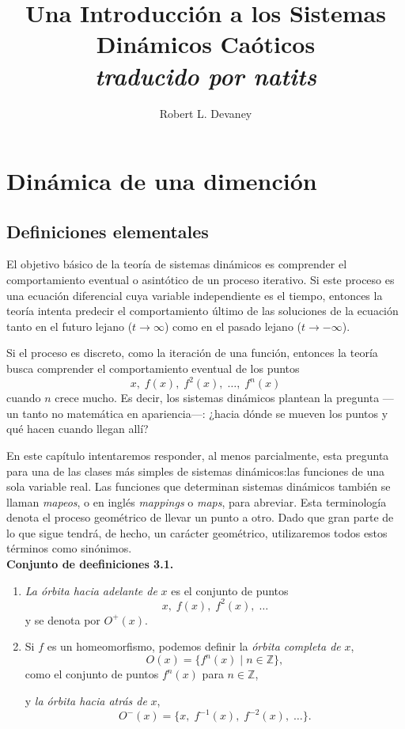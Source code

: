 \documentclass[10pt,a4paper]{book}
\title{Una Introducción a los Sistemas Dinámicos Caóticos \\ \small \textit{traducido por natits}}
\author{Robert L. Devaney}
\begin{document}
\maketitle
\newpage
\tableofcontents
\newpage
\chapter{Dinámica de una dimención}
\section{Definiciones elementales}
El objetivo básico de la teoría de sistemas dinámicos es comprender el comportamiento eventual o asintótico de un proceso iterativo. Si este proceso es una ecuación diferencial cuya variable independiente es el tiempo, entonces la teoría intenta predecir el comportamiento último de las soluciones de la ecuación tanto en el futuro lejano ($t \to \infty$) como en el pasado lejano ($t \to -\infty$).  

Si el proceso es discreto, como la iteración de una función, entonces la teoría busca comprender el comportamiento eventual de los puntos 
\[
x,\; f(x),\; f^{2}(x),\; \dots,\; f^{n}(x)
\]
cuando $n$ crece mucho. Es decir, los sistemas dinámicos plantean la pregunta —un tanto no matemática en apariencia—: ¿hacia dónde se mueven los puntos y qué hacen cuando llegan allí?  

En este capítulo intentaremos responder, al menos parcialmente, esta pregunta para una de las clases más simples de sistemas dinámicos:las funciones de una sola variable real. Las funciones que determinan sistemas dinámicos también se llaman \emph{mapeos}, o en inglés \emph{mappings} o \emph{maps}, para abreviar. Esta terminología denota el proceso geométrico de llevar un punto a otro. Dado que gran parte de lo que sigue tendrá, de hecho, un carácter geométrico, utilizaremos todos estos términos como sinónimos.
\\


\textbf{Conjunto de deefiniciones 3.1.} 
\begin{enumerate}
	\item \textit{La órbita hacia adelante de} $x$ es el conjunto de puntos 
\[
x,\; f(x),\; f^{2}(x),\; \dots
\]
y se denota por $O^{+}(x)$.  

	\item Si $f$ es un homeomorfismo, podemos definir la \textit{órbita completa de }$x$, 
\[
O(x) = \{ f^{n}(x) \;|\; n \in \mathbb{Z} \},
\]
como el conjunto de puntos $f^{n}(x)$ para $n \in \mathbb{Z}$,  

y \textit{la órbita hacia atrás de} $x$,
\[
O^{-}(x) = \{x,\; f^{-1}(x),\; f^{-2}(x),\; \dots \}.
\]
\end{enumerate}
\end{document}
